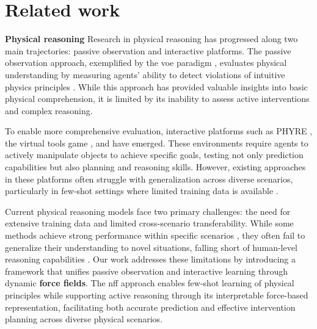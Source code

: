 \section{Related work}
\textbf{Physical reasoning\quad{}}
Research in physical reasoning has progressed along two main trajectories: passive observation and interactive platforms. The passive observation approach, exemplified by the \ac{voe} paradigm \citep{spelke1992origins}, evaluates physical understanding by measuring agents' ability to detect violations of intuitive physics principles \citep{ee1987object,hespos2001infants,dai2023x}. While this approach has provided valuable insights into basic physical comprehension, it is limited by its inability to assess active interventions and complex reasoning.

To enable more comprehensive evaluation, interactive platforms such as PHYRE \citep{bakhtin2019phyre}, the virtual tools game \citep{allen2020rapid}, and \benchmark \citep{li2023phyre} have emerged. These environments require agents to actively manipulate objects to achieve specific goals, testing not only prediction capabilities but also planning and reasoning skills. However, existing approaches in these platforms often struggle with generalization across diverse scenarios, particularly in few-shot settings where limited training data is available \citep{qi2021learning,li2023phyre}.

Current physical reasoning models face two primary challenges: the need for extensive training data and limited cross-scenario transferability. While some methods achieve strong performance within specific scenarios \citep{allen2020rapid}, they often fail to generalize their understanding to novel situations, falling short of human-level reasoning capabilities \citep{kang2024far}. Our work addresses these limitations by introducing a framework that unifies passive observation and interactive learning through dynamic \textbf{force fields}. The \ac{nff} approach enables few-shot learning of physical principles while supporting active reasoning through its interpretable force-based representation, facilitating both accurate prediction and effective intervention planning across diverse physical scenarios.

